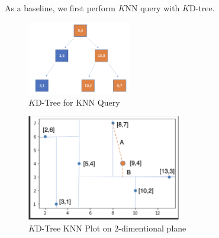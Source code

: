 As a baseline, we first perform $K$NN query with $K$D-tree.

\begin{figure}[htp]
    \centering
    \includegraphics[width=0.4\textwidth]{graphs/KD-Tree_KNN_Tree.png}
    \caption{$K$D-Tree for KNN Query}
    \label{fig:$K$D-Tree_for_KNN Query}
\end{figure}

\begin{figure}[htp]
    \centering
    \includegraphics[width=0.6\textwidth]{graphs/KD-Tree_KNN_plot.png}
    \caption{$K$D-Tree KNN Plot on 2-dimentional plane}
    \label{fig:KD_Tree_KNN_Plot}
\end{figure}


